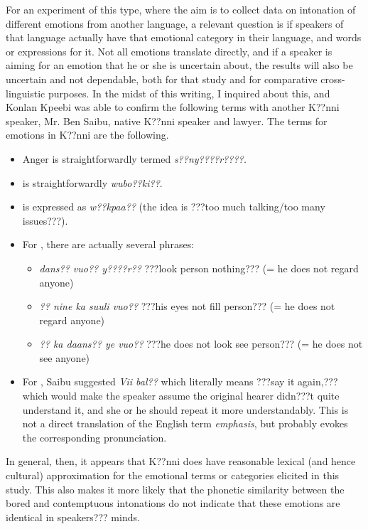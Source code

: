 \documentclass[output=paper]{langsci/langscibook}
\begin{document}
For an experiment of this type, where the aim is to collect data on intonation of different emotions from another language, a relevant question is if speakers of that language actually have that emotional category in their language, and words or expressions for it. Not all emotions translate directly, and if a speaker is aiming for an emotion that he or she is uncertain about, the results will also be uncertain and not dependable, both for that study and for comparative cross-linguistic purposes. In the midst of this writing, I inquired about this, and Konlan Kpeebi was able to confirm the following terms with another K??nni speaker, Mr. Ben Saibu, native K??nni speaker and lawyer. The\textit{ }terms for emotions in K??nni are the following.

\begin{itemize}
\item Anger is straightforwardly termed \emph{s??ny????r????}\emph{\textup{.}}
\item {} is straightforwardly \emph{wubo??ki??}. 
\item {} is expressed as \emph{w??kpaa??} (the idea is ???too much talking/too many issues???).
\item For , there are actually several phrases: 

\begin{itemize}
\item \emph{dans?? vuo?? y????r??} ???look person nothing??? (= he does not regard anyone) 
\item \emph{?? nine ka suuli vuo??} ???his eyes not fill person??? (= he does not regard anyone) 
\item \emph{?? ka daans?? ye vuo?? }???he does not look see person??? (= he does not see anyone)
\end{itemize}
\item For , Saibu suggested \textit{Vii bal??} which literally means ???say it again,??? which would make the speaker assume the original hearer didn???t quite understand it, and she or he should repeat it more understandably. This is not a direct translation of the English term \emph{emphasis}, but probably evokes the corresponding pronunciation.
\end{itemize}

In general, then, it appears that K??nni does have reasonable lexical (and hence cultural) approximation for the emotional terms or categories elicited in this study. This also makes it more likely that the phonetic similarity between the bored and contemptuous intonations do not indicate that these emotions are identical in speakers??? minds. 
\end{document}
